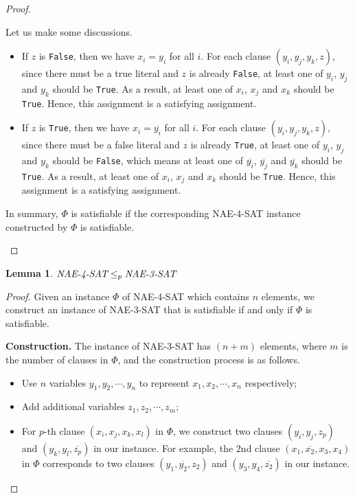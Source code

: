 \documentclass[12pt,a4paper]{article}
\newtheorem{lemma}[theorem]{Lemma}
\theoremstyle{definition}
\begin{document}
\begin{enumerate}
\begin{proof}
\begin{itemize}
        Let us make some discussions.
        \begin{itemize}
        \item If $z$ is \texttt{False}, then we have $x_i = y_i$ for all $i$. For each clause $(y_i, y_j, y_k, z)$, since there must be a true literal and $z$ is already \texttt{False}, at least one of $y_i$, $y_j$ and $y_k$ should be \texttt{True}. As a result, at least one of $x_i$, $x_j$ and $x_k$ should be \texttt{True}. Hence, this assignment is a satisfying assignment.
        \item If $z$ is \texttt{True}, then we have $x_i = \overline{y_i}$ for all $i$. For each clause $(y_i, y_j, y_k, z)$, since there must be a false literal and $z$ is already \texttt{True}, at least one of $y_i$, $y_j$ and $y_k$ should be \texttt{False}, which means at least one of $\overline{y_i}$, $\overline{y_j}$ and $\overline{y_k}$ should be \texttt{True}. As a result, at least one of $x_i$, $x_j$ and $x_k$ should be \texttt{True}. Hence, this assignment is a satisfying assignment.
        \end{itemize}
        In summary, $\Phi$ is satisfiable if the corresponding NAE-4-SAT instance constructed by $\Phi$ is satisfiable.    
    \end{itemize}
    \end{proof}
    
    \begin{lemma}\label{NAE-4-SAT-REDUCE-NAE-3-SAT}
    $\emph{NAE-4-SAT} \leq_p \emph{NAE-3-SAT}$
    \end{lemma}
    \begin{proof}
    Given an instance $\Phi$ of NAE-4-SAT which contains $n$ elements, we construct an instance of NAE-3-SAT that is satisfiable if and only if $\Phi$ is satisfiable.
    
    \textbf{Construction.} The instance of NAE-3-SAT has $(n+m)$ elements, where $m$ is the number of clauses in $\Phi$, and the construction process is as follows.
    \begin{itemize}
    \item Use $n$ variables $y_1, y_2, \cdots, y_n$ to represent $x_1, x_2, \cdots, x_n$ respectively;
    \item Add additional variables $z_1, z_2, \cdots, z_m$;
    \item For $p$-th clause $(x_i, x_j, x_k, x_l)$ in $\Phi$, we construct two clauses $(y_i, y_j, z_p)$ and $(y_k, y_l, \overline{z_p})$ in our instance. For example, the 2nd clause $(x_1, \overline{x_2}, x_3, x_4)$ in $\Phi$ corresponds to two clauses $(y_1, \overline{y_2}, z_2)$ and $(y_3, y_4, \overline{z_2})$ in our instance.
    \end{itemize}
    

\end{proof}
\end{enumerate}
\end{document}
